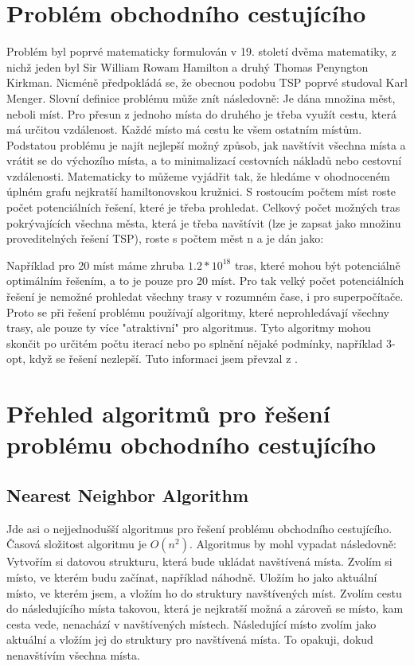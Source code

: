 \chapter{Problém obchodního cestujícího}
Problém byl poprvé matematicky formulován v 19. století dvěma matematiky, z nichž jeden byl Sir William Rowam Hamilton a druhý Thomas Penyngton Kirkman. Nicméně předpokládá se, že obecnou podobu TSP poprvé studoval Karl Menger. Slovní definice problému může znít následovně: Je dána množina měst, neboli míst. Pro přesun z jednoho místa do druhého je třeba využít cestu, která má určitou vzdálenost. Každé místo má cestu ke všem ostatním místům. Podstatou problému je najít nejlepší možný způsob, jak navštívit všechna místa a vrátit se do výchozího místa, a to minimalizací cestovních nákladů nebo cestovní vzdálenosti. Matematicky to můžeme vyjádřit tak, že hledáme v ohodnoceném úplném grafu nejkratší hamiltonovskou kružnici. S rostoucím počtem míst roste počet potenciálních řešení, které je třeba prohledat. Celkový počet možných tras pokrývajících všechna města, která je třeba navštívit (lze je zapsat jako množinu proveditelných řešení TSP), roste s počtem měst n a je dán jako:
\begin{center}
\end{center}
Například pro 20 míst máme zhruba $1.2 * 10^{18}$ tras, které mohou být potenciálně optimálním řešením, a to je pouze pro 20 míst. Pro tak velký počet potenciálních řešení je nemožné prohledat všechny trasy v rozumném čase, i pro superpočítače. Proto se při řešení problému používají algoritmy, které neprohledávají všechny trasy, ale pouze ty více "atraktivní" pro algoritmus. Tyto algoritmy mohou skončit po určitém počtu iterací nebo po splnění nějaké podmínky, například 3-opt, když se řešení nezlepší. Tuto informaci jsem převzal z \cite{TSPbook}.




\chapter{Přehled algoritmů pro řešení problému obchodního cestujícího}
\section{Nearest Neighbor Algorithm}
Jde asi o nejjednodušší algoritmus pro řešení problému obchodního cestujícího. Časová složitost algoritmu je $O(n^2)$. Algoritmus by mohl vypadat následovně: Vytvořím si datovou strukturu, která bude ukládat navštívená místa. Zvolím si místo, ve kterém budu začínat, například náhodně. Uložím ho jako aktuální místo, ve kterém jsem, a vložím ho do struktury navštívených míst. Zvolím cestu do následujícího místa takovou, která je nejkratší možná a zároveň se místo, kam cesta vede, nenachází v navštívených místech. Následující místo zvolím jako aktuální a vložím jej do struktury pro navštívená místa. To opakuji, dokud nenavštívím všechna místa.
